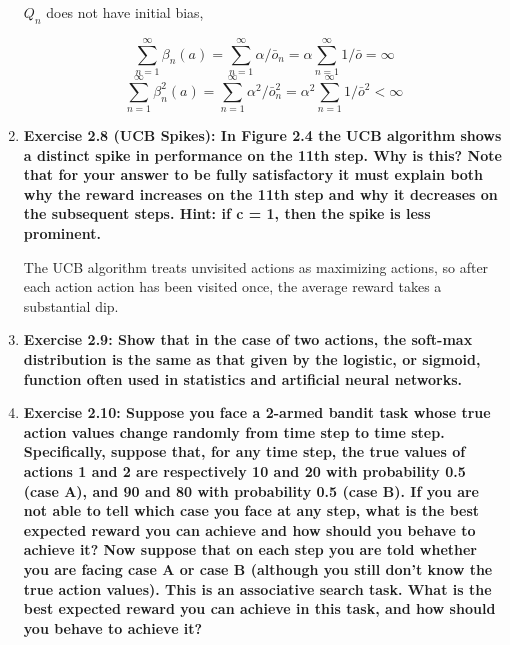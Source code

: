\documentclass[11pt]{article}
\begin{document}
\begin{enumerate}
		$Q_n$ does not have initial bias,
		
		$$\sum_{n=1}^\infty\beta_n(a)=\sum_{n=1}^\infty\alpha/\bar{o}_n=\alpha\sum_{n=1}^\infty1/\bar{o}=\infty$$
		$$\sum_{n=1}^\infty\beta^2_n(a)=\sum_{n=1}^\infty\alpha^2/\bar{o}^2_n=\alpha^2 \sum_{n=1}^\infty 1/\bar{o}^2<\infty$$
		
		\item \textbf{Exercise 2.8 (UCB Spikes): In Figure 2.4 the UCB algorithm shows a distinct spike in performance on the 11th step. Why is this? Note that for your answer to
		be fully satisfactory it must explain both why the reward increases on the 11th step and why it decreases on the subsequent steps. Hint: if c = 1, then the spike is less
		prominent.}
		
		The UCB algorithm treats unvisited actions as maximizing actions, so after each action action has been visited once, the average reward takes a substantial dip.
		
		\item \textbf{Exercise 2.9: Show that in the case of two actions, the soft-max distribution is the same as that given by the logistic, or sigmoid, function often used in
		statistics and artificial neural networks.}
		
		\item \textbf{Exercise 2.10: Suppose you face a 2-armed bandit task whose true action values change randomly from time step to time step. Specifically, suppose that, for
		any time step, the true values of actions 1 and 2 are respectively 10 and 20 with probability 0.5 (case A), and 90 and 80 with probability 0.5 (case B). If you are not
		able to tell which case you face at any step, what is the best expected reward you can achieve and how should you behave to achieve it? Now suppose that on each step you
		are told whether you are facing case A or case B (although you still don’t know the true action values). This is an associative search task. What is the best expected
		reward you can achieve in this task, and how should you behave to achieve it?}
		
	\end{enumerate}
	
\end{document}
